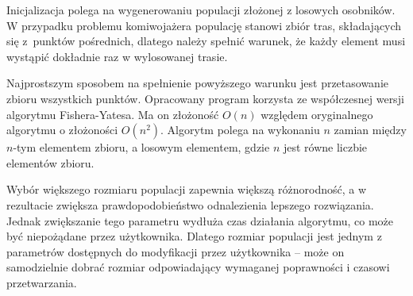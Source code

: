 Inicjalizacja polega na wygenerowaniu populacji złożonej z losowych osobników. W przypadku problemu komiwojażera populację stanowi zbiór tras, składających się z~punktów pośrednich, dlatego należy spełnić warunek, że każdy element musi wystąpić dokładnie raz w wylosowanej trasie.

Najprostszym sposobem na spełnienie powyższego warunku jest przetasowanie zbioru wszystkich punktów. Opracowany program korzysta ze współczesnej wersji algorytmu Fishera-Yatesa\cite{shuffle}. Ma on złożoność $O(n)$ względem oryginalnego algorytmu o złożoności $O(n^{2})$. Algorytm polega na wykonaniu $n$ zamian między $n$-tym elementem zbioru, a losowym elementem, gdzie $n$ jest równe liczbie elementów zbioru.

Wybór większego rozmiaru populacji zapewnia większą różnorodność, a w rezultacie zwiększa prawdopodobieństwo odnalezienia lepszego rozwiązania. Jednak zwiększanie tego parametru wydłuża czas działania algorytmu, co może być niepożądane przez użytkownika. Dlatego rozmiar populacji jest jednym z parametrów dostępnych do modyfikacji przez użytkownika -- może on samodzielnie dobrać rozmiar odpowiadający wymaganej poprawności i czasowi przetwarzania.